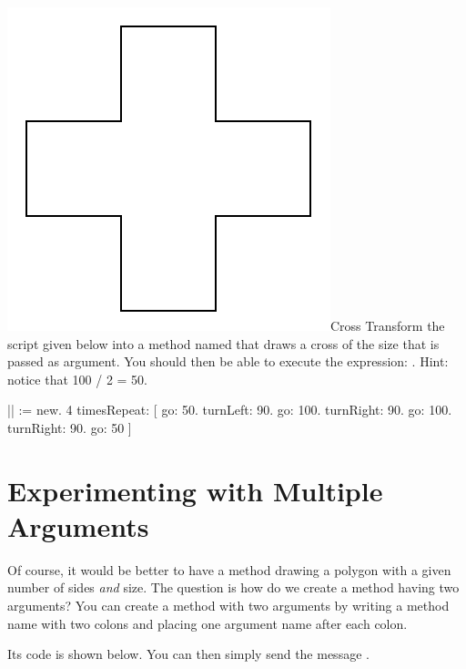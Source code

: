 \begin{exofigwithsizeandtitle}[0.5]{\includegraphics{Argcrossscr}}{Cross}
Transform the script given below into a method named  that draws a cross of the size that is passed as argument. You should then be able to execute the expression: . Hint: notice that 100 / 2 = 50.
\begin{nalltt}
|\caro|
\caro := \Turtle new.
4 timesRepeat: 
               [ \caro go: 50. 
               \caro turnLeft: 90. 
               \caro go: 100. 
               \caro turnRight: 90. 
               \caro go: 100.
               \caro turnRight: 90.
               \caro go: 50 ]

\end{nalltt}
\end{exofigwithsizeandtitle}




\section{Experimenting with Multiple Arguments}
Of course, it would be better to have a method drawing a polygon with a given number of sides \emph{and} size. The question is how do we create a method having two arguments?  You can create a method with two arguments by writing a method name with two colons and placing one argument name after each colon.

 Its code is shown below. You can then simply send the message .




